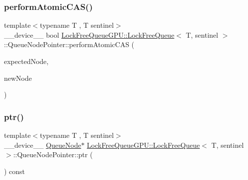 \subsubsection{\texorpdfstring{perform\+Atomic\+C\+A\+S()}{performAtomicCAS()}}
{\footnotesize\ttfamily template$<$typename T , T sentinel$>$ \\
\+\_\+\+\_\+device\+\_\+\+\_\+ bool \mbox{\hyperlink{class_lock_free_queue_g_p_u_1_1_lock_free_queue}{Lock\+Free\+Queue\+G\+P\+U\+::\+Lock\+Free\+Queue}}$<$ T, sentinel $>$\+::Queue\+Node\+Pointer\+::perform\+Atomic\+C\+AS (\begin{DoxyParamCaption}\item[{const \mbox{\hyperlink{class_lock_free_queue_g_p_u_1_1_lock_free_queue_1_1_queue_node_pointer}{Queue\+Node\+Pointer}} \&}]{expected\+Node,  }\item[{const \mbox{\hyperlink{class_lock_free_queue_g_p_u_1_1_lock_free_queue_1_1_queue_node_pointer}{Queue\+Node\+Pointer}} \&}]{new\+Node }\end{DoxyParamCaption})\hspace{0.3cm}{\ttfamily [inline]}}

\mbox{\label{class_lock_free_queue_g_p_u_1_1_lock_free_queue_1_1_queue_node_pointer_a3a8f5737220b153b6c3d5411251832cf}} 
\subsubsection{\texorpdfstring{ptr()}{ptr()}}
{\footnotesize\ttfamily template$<$typename T , T sentinel$>$ \\
\+\_\+\+\_\+device\+\_\+\+\_\+ \mbox{\hyperlink{class_lock_free_queue_g_p_u_1_1_lock_free_queue_1_1_queue_node}{Queue\+Node}}$\ast$ \mbox{\hyperlink{class_lock_free_queue_g_p_u_1_1_lock_free_queue}{Lock\+Free\+Queue\+G\+P\+U\+::\+Lock\+Free\+Queue}}$<$ T, sentinel $>$\+::Queue\+Node\+Pointer\+::ptr (\begin{DoxyParamCaption}{ }\end{DoxyParamCaption}) const\hspace{0.3cm}{\ttfamily [inline]}}



